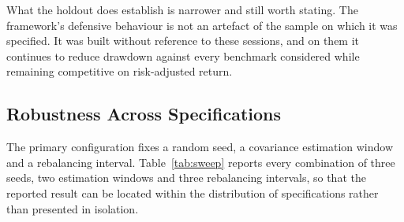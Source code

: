 \documentclass{singlecol-new}
\theoremstyle{TH}{
\newtheorem{lemma}{Lemma}
\newtheorem{theorem}[lemma]{Theorem}
\newtheorem{corrolary}[lemma]{Corrolary}
\newtheorem{conjecture}[lemma]{Conjecture}
\newtheorem{proposition}[lemma]{Proposition}
\newtheorem{claim}[lemma]{Claim}
\newtheorem{stheorem}[lemma]{Wrong Theorem}
\newtheorem{algorithm}{Algorithm}
}
\theoremstyle{THrm}{
\newtheorem{definition}{Definition}[section]
\newtheorem{question}{Question}[section]
\newtheorem{remark}{Remark}
\newtheorem{scheme}{Scheme}
}
\theoremstyle{THhit}{
\newtheorem{case}{Case}[section]
}
\begin{document}
What the holdout does establish is narrower and still worth stating. The framework's
defensive behaviour is not an artefact of the sample on which it was specified. It was
built without reference to these sessions, and on them it continues to reduce drawdown
against every benchmark considered while remaining competitive on risk-adjusted return.

\subsection{Robustness Across Specifications}
\label{sec:robust}

The primary configuration fixes a random seed, a covariance estimation window and a
rebalancing interval. Table~\ref{tab:sweep} reports every combination of three seeds, two estimation
windows and three rebalancing intervals, so that the reported result can be located
within the distribution of specifications rather than presented in isolation.
\end{document}
